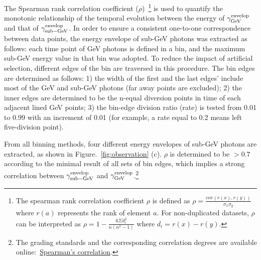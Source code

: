 \documentclass[linenumbers,twocolumn]{aastex631}
\begin{document}
The Spearman rank correlation coefficient ($\rho$)~\citep{spearman}\footnote{The spearman rank correlation coefficient $\rho$ is defined as $\rho = \frac{\mathrm{cov}(r(x),r(y))}{\sigma_x \sigma_y} $ where $r(a)$ represents the rank of element $a$. For non-duplicated datasets, $\rho$ can be interpreted as $\rho = 1 - \frac{6 \Sigma d^2_i}{n(n^2-1)} $ where $d_i = r(x) - r(y)$.} is used to quantify the monotonic relationship of the temporal evolution between the energy of $\gamma^{\rm envelop}_{\rm GeV}$ and that of $\gamma^{\rm envelop}_{\rm sub-GeV}$. %
In order to ensure a consistent one-to-one correspondence between data points, the energy envelope of sub-GeV photons was extracted as follows: each time point of GeV photons is defined in a bin, and the maximum sub-GeV energy value in that bin was adopted. To reduce the impact of artificial selection, different edges of the bin are traversed in this procedure. The bin edges are determined as follows: 1) the width of the first and the last edges' include most of the GeV and sub-GeV photons (far away points are excluded); 2) the inner edges are determined to be the n-equal diversion points in time of each adjacent lined GeV points; 3) the bin-edge division ratio (rate) is tested from 0.01 to 0.99 with an increment of 0.01 (for example, a rate equal to 0.2 means left five-division point). 

From all binning methods, four different energy envelopes of sub-GeV photons are extracted, as shown in Figure.~\ref{fig:observation} (c). $\rho$ is determined to be $> 0.7$ according to the minimal result of all sets of bin edges, which implies a strong correlation between $\gamma^{\rm envelop}_{\rm sub-GeV}$ and $\gamma^{\rm envelop}_{\rm GeV}$.\footnote{The grading standards and the corresponding correlation degrees are available online:~\href{https://www.statstutor.ac.uk/resources/uploaded/spearmans.pdf}{Spearman's correlation}. }
\end{document}
